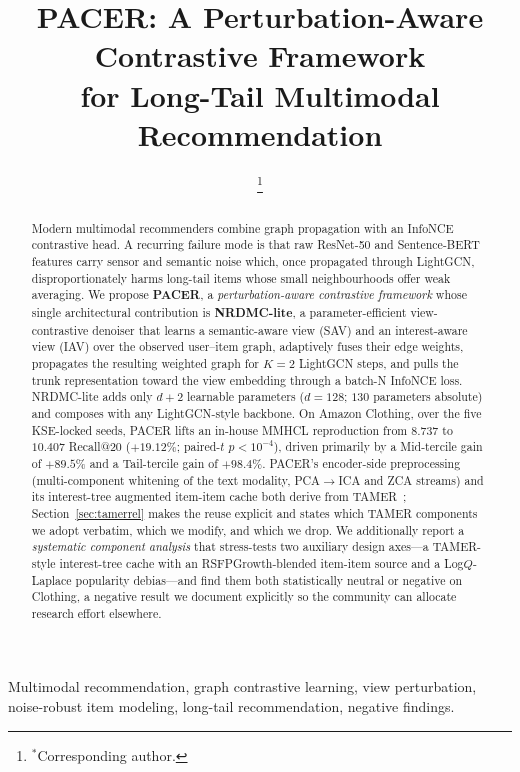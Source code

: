 \documentclass[conference]{IEEEtran}
\title{PACER: A Perturbation-Aware Contrastive Framework\\for Long-Tail Multimodal Recommendation}
\author{
\IEEEauthorblockN{Minh-Khoi Le, Duc-Trong Le$^{*}$}
\IEEEauthorblockA{VNU University of Engineering and Technology, Hanoi, Vietnam\\
\{khoilm, trongld\}@vnu.edu.vn}
\thanks{$^{*}$Corresponding author.}
}
\begin{document}
\maketitle

\begin{abstract}
Modern multimodal recommenders combine graph propagation with an
InfoNCE contrastive head. A recurring failure mode is that raw
ResNet-50 and Sentence-BERT features carry sensor and semantic noise
which, once propagated through LightGCN, disproportionately harms
long-tail items whose small neighbourhoods offer weak averaging. We
propose \textbf{PACER}, a \emph{perturbation-aware contrastive
framework} whose single architectural contribution is
\textbf{NRDMC-lite}, a parameter-efficient view-contrastive denoiser
that learns a semantic-aware view (SAV) and an interest-aware view
(IAV) over the observed user--item graph, adaptively fuses their edge
weights, propagates the resulting weighted graph for $K{=}2$ LightGCN
steps, and pulls the trunk representation toward the view embedding
through a batch-N InfoNCE loss. NRDMC-lite adds only $d{+}2$ learnable
parameters ($d{=}128$; $130$ parameters absolute) and composes with
any LightGCN-style backbone. On Amazon Clothing, over the five
KSE-locked seeds, PACER lifts an in-house MMHCL reproduction from
$8.737$ to $10.407$ Recall@20 ($+19.12\%$; paired-$t$ $p<10^{-4}$),
driven primarily by a Mid-tercile gain of $+89.5\%$ and a Tail-tercile
gain of $+98.4\%$. PACER's encoder-side preprocessing (multi-component whitening of the
text modality, PCA$\to$ICA and ZCA streams) and its interest-tree
augmented item-item cache both derive from TAMER~\cite{meng2025tamer};
Section~\ref{sec:tamerrel} makes the reuse explicit and states which
TAMER components we adopt verbatim, which we modify, and which we
drop. We additionally report a \emph{systematic component analysis}
that stress-tests two auxiliary design axes---a TAMER-style
interest-tree cache with an RSFPGrowth-blended item-item source and a
Log$Q$-Laplace popularity debias---and find them both statistically
neutral or negative on Clothing, a negative result we document
explicitly so the community can allocate research effort elsewhere.
\end{abstract}

\begin{IEEEkeywords}
Multimodal recommendation, graph contrastive learning, view perturbation,
noise-robust item modeling, long-tail recommendation, negative findings.
\end{IEEEkeywords}
\end{document}
